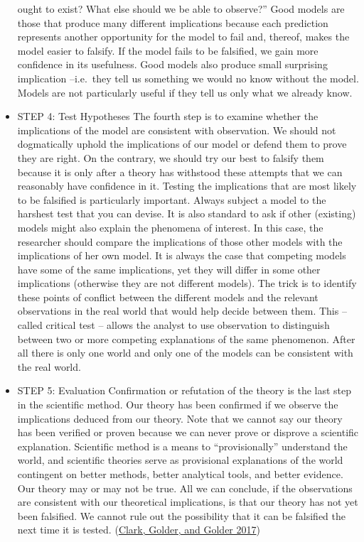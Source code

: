 \documentclass{book}
\begin{document}
\begin{itemize}
  ought to exist? What else should we be able to observe?'' Good models are
  those that produce many different implications because each prediction
  represents another opportunity for the model to fail and, thereof, makes the
  model easier to falsify. If the model fails to be falsified, we gain more
  confidence in its usefulness. Good models also produce small surprising
  implication --i.e.~they tell us something we would no know without the
  model. Models are not particularly useful if they tell us only what we
  already know.\\
\item
  STEP 4: Test Hypotheses The fourth step is to examine whether the
  implications of the model are consistent with observation. We should not
  dogmatically uphold the implications of our model or defend them to prove
  they are right. On the contrary, we should try our best to falsify them
  because it is only after a theory has withstood these attempts that we can
  reasonably have confidence in it. Testing the implications that are most
  likely to be falsified is particularly important. Always subject a model to
  the harshest test that you can devise. It is also standard to ask if other
  (existing) models might also explain the phenomena of interest. In this
  case, the researcher should compare the implications of those other models
  with the implications of her own model. It is always the case that competing
  models have some of the same implications, yet they will differ in some
  other implications (otherwise they are not different models). The trick is
  to identify these points of conflict between the different models and the
  relevant observations in the real world that would help decide between them.
  This --called critical test -- allows the analyst to use observation to
  distinguish between two or more competing explanations of the same
  phenomenon. After all there is only one world and only one of the models can
  be consistent with the real world.
\item
  STEP 5: Evaluation Confirmation or refutation of the theory is the last step
  in the scientific method. Our theory has been confirmed if we observe the
  implications deduced from our theory. Note that we cannot say our theory has
  been verified or proven because we can never prove or disprove a scientific
  explanation. Scientific method is a means to ``provisionally'' understand
  the world, and scientific theories serve as provisional explanations of the
  world contingent on better methods, better analytical tools, and better
  evidence. Our theory may or may not be true. All we can conclude, if the
  observations are consistent with our theoretical implications, is that our
  theory has not yet been falsified. We cannot rule out the possibility that
  it can be falsified the next time it is tested.
  (\protect\hyperlink{ref-clark2017principles}{Clark, Golder, and Golder
  2017})
\end{itemize}
\end{document}
